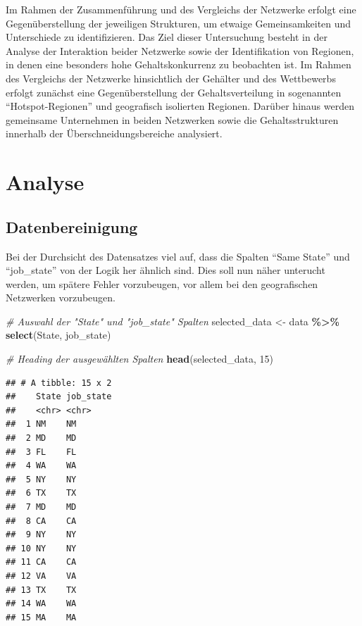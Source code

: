\documentclass[
]{article}
\newenvironment{Shaded}{\begin{snugshade}}{\end{snugshade}}
\newcommand{\CommentTok}[1]{\textcolor[rgb]{0.56,0.35,0.01}{\textit{#1}}}
\newcommand{\DecValTok}[1]{\textcolor[rgb]{0.00,0.00,0.81}{#1}}
\newcommand{\FunctionTok}[1]{\textcolor[rgb]{0.13,0.29,0.53}{\textbf{#1}}}
\newcommand{\NormalTok}[1]{#1}
\newcommand{\OtherTok}[1]{\textcolor[rgb]{0.56,0.35,0.01}{#1}}
\newcommand{\SpecialCharTok}[1]{\textcolor[rgb]{0.81,0.36,0.00}{\textbf{#1}}}
\begin{document}
Im Rahmen der Zusammenführung und des Vergleichs der Netzwerke erfolgt
eine Gegenüberstellung der jeweiligen Strukturen, um etwaige
Gemeinsamkeiten und Unterschiede zu identifizieren. Das Ziel dieser
Untersuchung besteht in der Analyse der Interaktion beider Netzwerke
sowie der Identifikation von Regionen, in denen eine besonders hohe
Gehaltskonkurrenz zu beobachten ist. Im Rahmen des Vergleichs der
Netzwerke hinsichtlich der Gehälter und des Wettbewerbs erfolgt zunächst
eine Gegenüberstellung der Gehaltsverteilung in sogenannten
``Hotspot-Regionen'' und geografisch isolierten Regionen. Darüber hinaus
werden gemeinsame Unternehmen in beiden Netzwerken sowie die
Gehaltsstrukturen innerhalb der Überschneidungsbereiche analysiert.

\newpage

\section{Analyse}\label{analyse}

\subsection{Datenbereinigung}\label{datenbereinigung}

Bei der Durchsicht des Datensatzes viel auf, dass die Spalten ``Same
State'' und ``job\_state'' von der Logik her ähnlich sind. Dies soll nun
näher unterucht werden, um spätere Fehler vorzubeugen, vor allem bei den
geografischen Netzwerken vorzubeugen.

\begin{Shaded}
\begin{Highlighting}[]
\CommentTok{\# Auswahl der "State" und "job\_state" Spalten}
\NormalTok{selected\_data }\OtherTok{\textless{}{-}}\NormalTok{ data }\SpecialCharTok{\%\textgreater{}\%}
  \FunctionTok{select}\NormalTok{(State, job\_state)}

\CommentTok{\# Heading der ausgewählten Spalten}
\FunctionTok{head}\NormalTok{(selected\_data, }\DecValTok{15}\NormalTok{)}
\end{Highlighting}
\end{Shaded}

\begin{verbatim}
## # A tibble: 15 x 2
##    State job_state
##    <chr> <chr>    
##  1 NM    NM       
##  2 MD    MD       
##  3 FL    FL       
##  4 WA    WA       
##  5 NY    NY       
##  6 TX    TX       
##  7 MD    MD       
##  8 CA    CA       
##  9 NY    NY       
## 10 NY    NY       
## 11 CA    CA       
## 12 VA    VA       
## 13 TX    TX       
## 14 WA    WA       
## 15 MA    MA
\end{verbatim}
\end{document}
